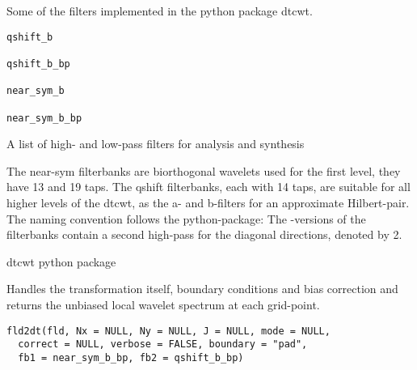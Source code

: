 \documentclass[a4paper]{book}
\begin{document}
%
\begin{Description}\relax
Some of the filters implemented in the python package dtcwt.
\end{Description}
%
\begin{Usage}
\begin{verbatim}
qshift_b

qshift_b_bp

near_sym_b

near_sym_b_bp
\end{verbatim}
\end{Usage}
%
\begin{Format}
A list of high- and low-pass filters for analysis and synthesis
\end{Format}
%
\begin{Details}\relax
The near-sym filterbanks are biorthogonal wavelets used for the first level, they have 13 and 19 taps. The qshift filterbanks, each with 14 taps, are suitable for all higher levels of the dtcwt, as the a- and b-filters for an approximate Hilbert-pair. The naming convention follows the python-package: 
The -versions of the filterbanks contain a second high-pass for the diagonal directions, denoted by 2.
\end{Details}
%
\begin{Source}\relax
dtcwt python package
\end{Source}
%
\begin{Description}\relax
Handles the transformation itself, boundary conditions and bias correction and returns the unbiased local wavelet spectrum at each grid-point.
\end{Description}
%
\begin{Usage}
\begin{verbatim}
fld2dt(fld, Nx = NULL, Ny = NULL, J = NULL, mode = NULL,
  correct = NULL, verbose = FALSE, boundary = "pad",
  fb1 = near_sym_b_bp, fb2 = qshift_b_bp)
\end{verbatim}
\end{Usage}
%
\end{document}
